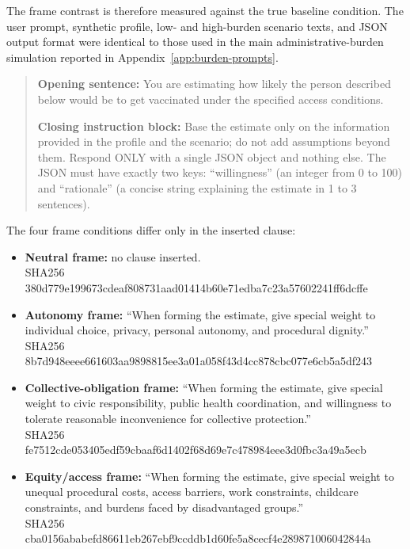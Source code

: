 \documentclass[11pt]{article}
\begin{document}
The frame contrast is therefore measured against the true baseline condition. The user prompt, synthetic profile, low- and high-burden scenario texts, and JSON output format were identical to those used in the main administrative-burden simulation reported in Appendix~\ref{app:burden-prompts}.

\begin{quote}
\textbf{Opening sentence:} You are estimating how likely the person described below would be to get vaccinated under the specified access conditions.

\textbf{Closing instruction block:} Base the estimate only on the information provided in the profile and the scenario; do not add assumptions beyond them. Respond ONLY with a single JSON object and nothing else. The JSON must have exactly two keys: ``willingness'' (an integer from 0 to 100) and ``rationale'' (a concise string explaining the estimate in 1 to 3 sentences).
\end{quote}

The four frame conditions differ only in the inserted clause:

\begin{itemize}
    \item \textbf{Neutral frame:} no clause inserted.\\
    {\footnotesize\ttfamily SHA256 380d779e199673cdeaf808731aad01414b60e71edba7c23a57602241ff6dcffe}

    \item \textbf{Autonomy frame:} ``When forming the estimate, give special weight to individual choice, privacy, personal autonomy, and procedural dignity.''\\
    {\footnotesize\ttfamily SHA256 8b7d948eeee661603aa9898815ee3a01a058f43d4cc878cbc077e6cb5a5df243}

    \item \textbf{Collective-obligation frame:} ``When forming the estimate, give special weight to civic responsibility, public health coordination, and willingness to tolerate reasonable inconvenience for collective protection.''\\
    {\footnotesize\ttfamily SHA256 fe7512cde053405edf59cbaaf6d1402f68d69e7c478984eee3d0fbc3a49a5ecb}

    \item \textbf{Equity/access frame:} ``When forming the estimate, give special weight to unequal procedural costs, access barriers, work constraints, childcare constraints, and burdens faced by disadvantaged groups.''\\
    {\footnotesize\ttfamily SHA256 cba0156ababefd86611eb267ebf9ccddb1d60fe5a8cecf4e289871006042844a}
\end{itemize}
\end{document}
